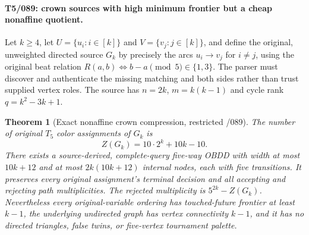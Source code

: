 \documentclass[11pt]{article}
\newtheorem{theorem}{Theorem}
\begin{document}
\paragraph{T5/089: crown sources with high minimum frontier but a cheap nonaffine quotient.}
Let $k\ge4$, let $U=\{u_i:i\in[k]\}$ and $V=\{v_j:j\in[k]\}$, and define the original, unweighted directed source $G_k$ by precisely the arcs
$u_i\to v_j$ for $i\ne j$, using the original beat relation
$R(a,b)\iff b-a\pmod5\in\{1,3\}$.
The parser must discover and authenticate the missing matching and both sides rather than trust supplied vertex roles.
The source has $n=2k$, $m=k(k-1)$ and cycle rank $q=k^2-3k+1$.

\begin{theorem}[Exact nonaffine crown compression, restricted /089]
The number of original $T_5$ color assignments of $G_k$ is
\[
Z(G_k)=10\cdot2^k+10k-10.
\]
There exists a source-derived, complete-query five-way OBDD with width at most $10k+12$ and at most $2k(10k+12)$ internal nodes, each with five transitions. It preserves every original assignment's terminal decision and all accepting and rejecting path multiplicities. The rejected multiplicity is $5^{2k}-Z(G_k)$.
Nevertheless every original-variable ordering has touched-future frontier at least $k-1$, the underlying undirected graph has vertex connectivity $k-1$, and it has no directed triangles, false twins, or five-vertex tournament palette.
\end{theorem}
\end{document}
